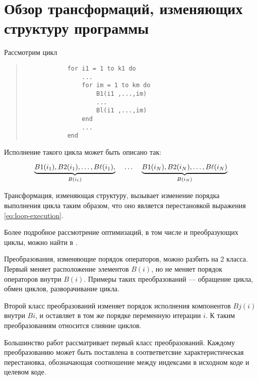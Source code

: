 \section{Обзор трансформаций, изменяющих структуру программы}

Рассмотрим цикл

\begin{center}
    \begin{quote}
        \begin{verbatim}
            for i1 = 1 to k1 do
                ...
                for im = 1 to km do
                    B1(i1 ,...,im)
                    ...
                    Bl(i1 ,...,im)
                end
                ...
            end
        \end{verbatim}
    \end{quote}
\end{center}

Исполнение такого цикла может быть описано так:

\begin{equation}\label{eq:loop-execution}
    \underbrace{B1(i_{1}), B2(i_{1}), \ldots, B\ell(i_{1}),}_{B(i_{1})} 
    \hspace{4mm} \ldots \hspace{4mm} 
    \underbrace{B1(i_{N}), B2(i_{N}), \ldots, B\ell(i_{N})}_{B(i_{N})}
\end{equation}

Трансформация, изменяющая структуру, вызывает изменение порядка выполнения цикла таким образом, что оно является перестановкой выражения \ref{eq:loop-execution}.

Более подробное рассмотрение оптимизаций, в том числе и преобразующих циклы, можно найти в \cite{ZuckPFGH02,Bacon}.

Преобразования, изменяющие порядок операторов, можно разбить на 2 класса. Первый меняет расположение элементов $B(i)$, но не меняет порядок операторов внутри $B(i)$. Примеры таких преобразований --- обращение цикла, обмен циклов, разворачивание цикла.

Второй класс преобразований изменяет порядок исполнения компонентов $Bj(i)$ внутри $B{i}$, и оставляет в том же порядке переменную итерации $i$. К таким преобразованиям относится слияние циклов.

Большинство работ рассматривает первый класс преобразований. Каждому преобразованию может быть поставлена в соответветсвие характеристическая перестановка, обозначающая соотношение между индексами в исходном коде и целевом коде.
